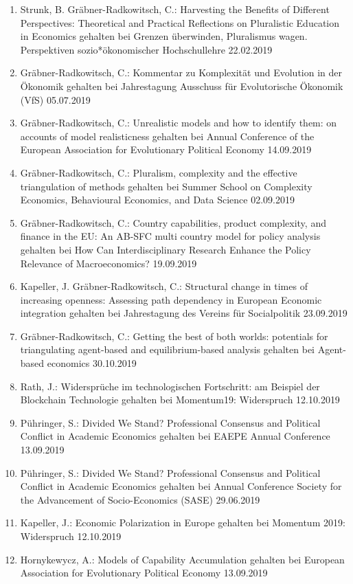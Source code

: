 \begin{enumerate}
	\item Strunk, B. Gräbner-Radkowitsch, C.: Harvesting the Benefits of Different Perspectives: Theoretical and Practical Reflections on Pluralistic Education in Economics gehalten bei Grenzen überwinden, Pluralismus wagen. Perspektiven sozio*ökonomischer Hochschullehre 22.02.2019
	\item Gräbner-Radkowitsch, C.: Kommentar zu Komplexität und Evolution in der Ökonomik gehalten bei Jahrestagung Ausschuss für Evolutorische Ökonomik (VfS) 05.07.2019
	\item Gräbner-Radkowitsch, C.: Unrealistic models and how to identify them: on accounts of model realisticness gehalten bei Annual Conference of the European Association for Evolutionary Political Economy 14.09.2019
	\item Gräbner-Radkowitsch, C.: Pluralism, complexity and the effective triangulation of methods gehalten bei Summer School on Complexity Economics, Behavioural Economics, and Data Science 02.09.2019
	\item Gräbner-Radkowitsch, C.: Country capabilities, product complexity, and finance in the EU: An AB-SFC multi country model for policy analysis gehalten bei How Can Interdisciplinary Research Enhance the Policy Relevance of Macroeconomics? 19.09.2019
	\item Kapeller, J. Gräbner-Radkowitsch, C.: Structural change in times of increasing openness: Assessing path dependency in European Economic integration gehalten bei Jahrestagung des Vereins für Socialpolitik 23.09.2019
	\item Gräbner-Radkowitsch, C.: Getting the best of both worlds: potentials for triangulating agent-based and equilibrium-based analysis gehalten bei Agent-based economics 30.10.2019
	\item Rath, J.: Widersprüche im technologischen Fortschritt: am Beispiel der Blockchain Technologie gehalten bei Momentum19: Widerspruch 12.10.2019
	\item Pühringer, S.: Divided We Stand? Professional Consensus and Political Conflict in Academic Economics gehalten bei EAEPE Annual Conference 13.09.2019
	\item Pühringer, S.: Divided We Stand? Professional Consensus and Political Conflict in Academic Economics gehalten bei Annual Conference Society for the Advancement of Socio-Economics (SASE) 29.06.2019
	\item Kapeller, J.: Economic Polarization in Europe gehalten bei Momentum 2019: Widerspruch 12.10.2019
	\item Hornykewycz, A.: Models of Capability Accumulation gehalten bei European Association for Evolutionary Political Economy 13.09.2019

\end{enumerate}
